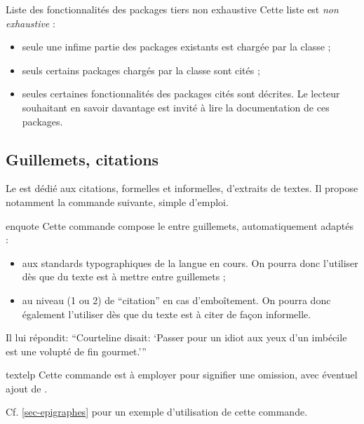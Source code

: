 \begin{dbwarning}{Liste des fonctionnalités des packages tiers non exhaustive}{}
  Cette liste est \emph{non exhaustive} :
  \begin{itemize}
  \item seule une infime partie des packages existants est chargée par la
    classe ;
  \item seuls certains packages chargés par la classe sont cités ;
  \item seules certaines fonctionnalités des packages cités sont décrites. Le
    lecteur souhaitant en savoir davantage est invité à lire la documentation de
    ces packages.
  \end{itemize}
\end{dbwarning}

\subsection{Guillemets, citations}
\label{sec-guillemets-citations}

Le  est dédié aux citations, formelles et informelles,
d'extraits de textes. Il propose notamment la commande 
suivante, simple d'emploi.

\begin{docCommand}{enquote}{}
  Cette commande compose le  entre guillemets, automatiquement
  adaptés :
  \begin{itemize}
  \item aux standards typographiques de la langue en cours. On pourra donc
    l'utiliser dès que du texte est à mettre entre guillemets ;
  \item au niveau (1 ou 2) de \enquote{citation} en cas d'emboîtement. On
    pourra donc également l'utiliser dès que du texte est à citer de façon
    informelle.
  \end{itemize}
\begin{bodycode}
Il lui répondit: \enquote{Courteline disait: \enquote{Passer pour un idiot aux
    yeux d'un imbécile est une volupté de fin gourmet.}}
\end{bodycode}
\end{docCommand}

\begin{docCommand}{textelp}{}
  Cette commande est à employer pour signifier une omission, avec éventuel ajout
  de .

  Cf. \vref{sec-epigraphes} pour un exemple d'utilisation de cette commande.
\end{docCommand}

